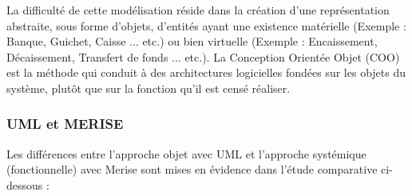 La difficulté de cette modélisation réside dans la création d’une représentation abstraite, sous
forme d’objets, d’entités ayant une existence matérielle (Exemple : Banque, Guichet, Caisse ...
etc.) ou bien virtuelle (Exemple : Encaissement, Décaissement, Transfert de fonds ... etc.).
La Conception Orientée Objet (COO) est la méthode qui conduit à des architectures logicielles
fondées sur les objets du système, plutôt que sur la fonction qu’il est censé réaliser.

\subsubsection{UML et MERISE}

Les différences entre l’approche objet avec UML et l’approche systémique (fonctionnelle)
avec Merise sont mises en évidence dans l’étude comparative ci- dessous :

